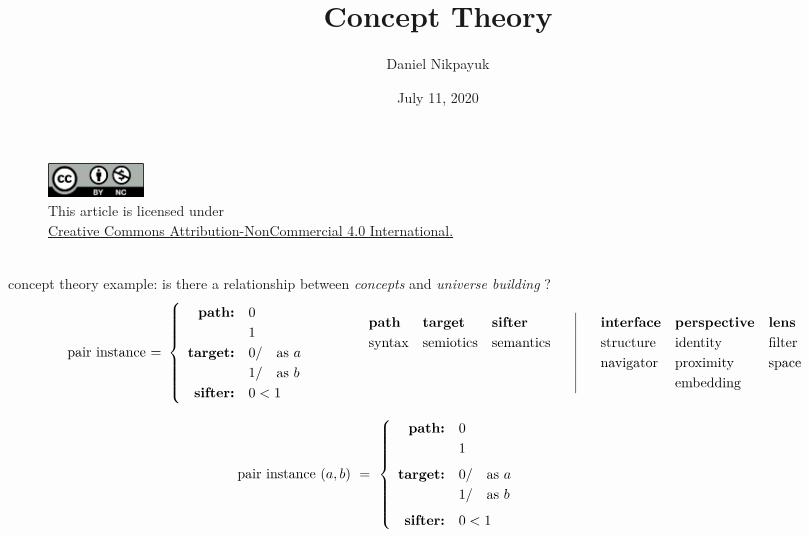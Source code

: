 \documentclass[twoside]{article}
\title{Concept Theory}
\author{Daniel Nikpayuk}
\date{July 11, 2020}
\newcommand{\bfmbox}[1]{\mbox{\bfseries #1}}
\newcommand{\tab}[1][1.125cm]{\hspace{#1}}
\newcommand{\col}[1][0ex]{& \hspace{#1}}
\begin{document}
\maketitle
\thispagestyle{empty}

\begin{figure}[h]
\centering
\includegraphics[width=1in]{../../../../cc-by-nc.png}\\[0.1in]
\tiny This article is licensed under \\
\href{http://creativecommons.org/licenses/by-nc/4.0/}
{Creative Commons Attribution-NonCommercial 4.0 International.}\\[0.3in]
\end{figure}

\ \\
\indent concept theory example: \tab[3.5cm] is there a relationship between \emph{concepts} and \emph{universe building} ?\\[-3ex]

$$ \def\arraystretch{1.2}
\tab[-0cm] \mbox{pair instance = }\left\{\begin{array}{rl}
\bfmbox{path:}		& 0							\\
			& 1							\\
\bfmbox{target:}	& 0/ \quad \mbox{as } a					\\
			& 1/ \quad \mbox{as } b					\\
\bfmbox{sifter:}	& 0 < 1							\\
\end{array}\right. \tab[1.25cm] \begin{array}{lll|lll}
\bfmbox{path}		& \bfmbox{target}	& \bfmbox{sifter}		\tab[3ex]\col[3ex]
\bfmbox{interface}	& \bfmbox{perspective}	& \bfmbox{lens}			\\

\mbox{syntax}		& \mbox{semiotics}	& \mbox{semantics}		\tab[3ex]\col[3ex]
\mbox{structure}	& \mbox{identity}	& \mbox{filter}			\\&&\col[3ex]
\mbox{navigator}	& \mbox{proximity}	& \mbox{space}			\\&&\col[3ex]
			& \mbox{embedding}
\end{array} $$

$$ \def\arraystretch{1.2}
\tab[-3cm] \mbox{pair instance } (a,b)\ =\ \left\{\begin{array}{rl}
\bfmbox{path:}		& 0							\\
			& 1							\\[1ex]
\bfmbox{target:}	& 0/ \quad \mbox{as } a					\\
			& 1/ \quad \mbox{as } b					\\[1ex]
\bfmbox{sifter:}	& 0 < 1							\\
\end{array}\right. $$
\ \\[-6ex]
\end{document}

